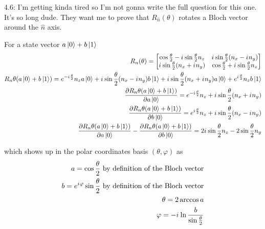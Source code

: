 \documentclass[12pt, letterpaper, twoside]{article}
\newcommand{\iu}{{i\mkern1mu}}
\newcommand{\halftheta}{\frac{\theta}{2}}
\newcommand{\twoXtwo}[4]{\begin{bmatrix}
    #1 & #3 \\
    #2 & #4
\end{bmatrix}}
\newcommand{\Rn}{\twoXtwo{
    \cos{\halftheta} - \iu \sin{\halftheta}n_z
    }{
        \iu \sin{\halftheta}(n_x + \iu n_y)
    }{
        \iu \sin{\halftheta}(n_x - \iu n_y)
    }{
        \cos{\halftheta} + \iu \sin{\halftheta}n_z
        }}
\begin{document}
4.6: I'm getting kinda tired so I'm not gonna write the full question for this one. It's so long dude. They want me to prove that $R_{\hat{n}}(\theta)$ rotates a Bloch vector around the $\hat{n}$ axis.

For a state vector $a\ket{0} + b\ket{1}$
\begin{subequations}
\begin{align}
R_n(\theta) = \Rn \\
R_n{\theta}(a\ket{0} + b\ket{1}) = e^{-\iu \halftheta}n_z a\ket{0} + \iu \sin{\halftheta}(n_x - \iu n_y)b\ket{1} + \iu \sin{\halftheta}(n_x + \iu n_y)a\ket{0} +  e^{\iu \halftheta}n_z b\ket{1} \\
\frac{\partial R_n{\theta}(a\ket{0} + b\ket{1})}{\partial a\ket{0}} = e^{-\iu \halftheta}n_z + \iu \sin{\halftheta}(n_x + \iu n_y) \\
\frac{\partial R_n{\theta}(a\ket{0} + b\ket{1})}{\partial b\ket{0}} = e^{\iu \halftheta}n_z + \iu \sin{\halftheta}(n_x - \iu n_y) \\
\frac{\partial R_n{\theta}(a\ket{0} + b\ket{1})}{\partial a\ket{0}} - \frac{\partial R_n{\theta}(a\ket{0} + b\ket{1})}{\partial b\ket{0}} = 2\iu \sin{\halftheta} n_z - 2\sin{\halftheta} n_y
\end{align}
\end{subequations}

which shows up in the polar coordinates basis $(\theta, \varphi)$ as
\begin{subequations}
\begin{align}
a = \cos{\halftheta} \text{ by definition of the Bloch vector} \\
b = e^{\iu \varphi} \sin{\halftheta} \text{ by definition of the Bloch vector} \\
\theta = 2\arccos{a} \\
\varphi = -\iu \ln{\frac{b}{\sin{\halftheta}}}
\end{align}
\end{subequations}
\end{document}
